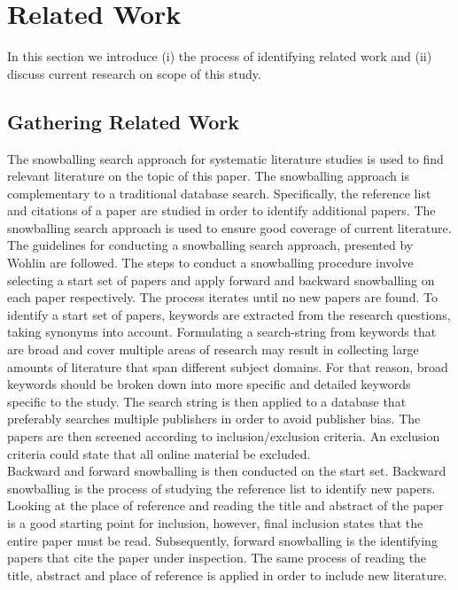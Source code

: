\iffalse  \fi
\chapter{Related Work}
In this section we introduce (i) the process of identifying related work and (ii) discuss current research on scope of this study. 




\section{Gathering Related Work}
The snowballing search approach for systematic literature studies is used to find relevant literature on the topic of this paper. The snowballing approach is complementary to a traditional database search. Specifically, the reference list and citations of a paper are studied in order to identify additional papers. The snowballing search approach is used to ensure good coverage of current literature.\\

The guidelines for conducting a snowballing search approach, presented by Wohlin \cite{Wohlin} are followed. The steps to conduct a snowballing procedure involve selecting a start set of papers and apply forward and backward snowballing on each paper respectively. The process iterates until no new papers are found. To identify a start set of papers, keywords are extracted from the research questions, taking synonyms into account. Formulating a search-string from keywords that are broad and cover multiple areas of research may result in collecting large amounts of literature that span different subject domains. For that reason, broad keywords should be broken down into more specific and detailed keywords specific to the study. The search string is then applied to a database that preferably searches multiple publishers in order to avoid publisher bias. The papers are then screened according to inclusion/exclusion criteria. An exclusion criteria could state that all online material be excluded. \\

Backward and forward snowballing is then conducted on the start set. Backward snowballing is the process of studying the reference list to identify new papers. Looking at the place of reference and reading the title and abstract of the paper is a good starting point for inclusion, however, final inclusion states that the entire paper must be read. Subsequently, forward snowballing is the identifying papers that cite the paper under inspection. The same process of reading the title, abstract and place of reference is applied in order to include new literature. 


